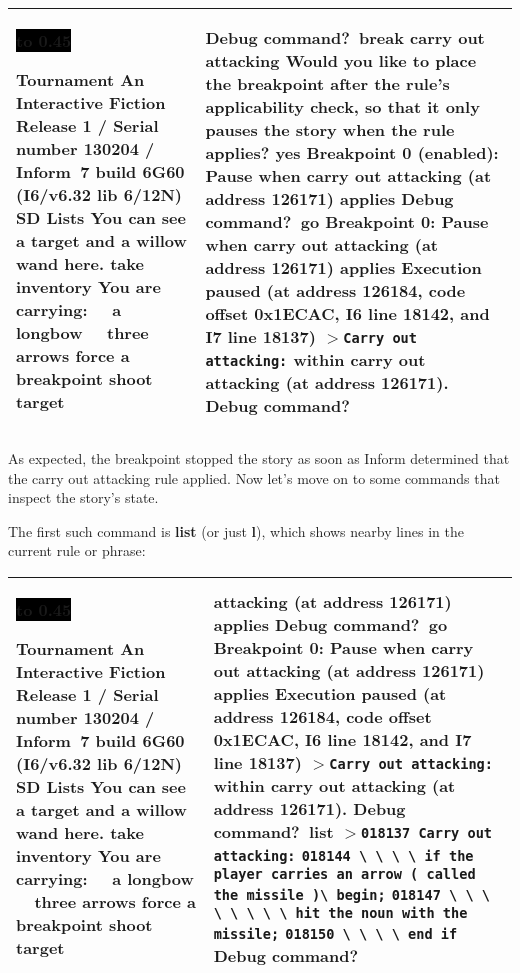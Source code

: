 \documentclass{book}
\newcommand{\n}{\hspace*{\fill}\newline}
\newcommand{\terp}[2]{\begin{center}\begin{tabular}{p{0.45\textwidth}|p{0.45\textwidth}}\midrule #1&#2\\\midrule\end{tabular}\end{center}}
\newcommand{\glkheading}[1]{\textbf{#1}}
\newcommand{\glkinput}[1]{\textbf{#1}}
\newcommand{\glkstatusline}[2]{\centerline{\colorbox{black}{\hbox to 0.45\textwidth{\textcolor{white}{#1\hfil #2}}}}}
\newcommand{\storyprompt}{\raisebox{1.5pt}{\(>\)}}
\newcommand{\cursor}{\raisebox{-1.5pt}{\RectangleThin}}
\newcommand{\markedindent}{\(>\)\qquad}
\newcommand{\unmarkedindent}{\hphantom{\(>\)}\qquad}
\begin{document}
\terp{\glkstatusline{Lists}{0/2}\n
  \glkheading{Tournament}\n
  An Interactive Fiction\n
  Release 1 / Serial number 130204 / Inform~7 build 6G60 (I6/v6.32 lib 6/12N) SD\n
  \n
  \glkheading{Lists}\n
  You can see a target and a willow wand here.\n
  \n
  \storyprompt\glkinput{take inventory}\n
  You are carrying:\n
  \null\ \ a longbow\n
  \null\ \ three arrows\n
  \n
  \storyprompt\glkinput{force a breakpoint}\n
  \storyprompt\glkinput{shoot target}}{%
  \n
  Debug command?\ \glkinput{break carry out attacking}\n
  \n
  Would you like to place the breakpoint after the rule's applicability check, so that it only pauses the story when the rule applies? \glkinput{yes}\n
  \n
  Breakpoint 0 (enabled): Pause when carry out attacking (at address 126171) applies\n
  \n
  Debug command?\ \glkinput{go}\n
  \n
  \glkheading{Breakpoint 0:} Pause when carry out attacking (at address 126171) applies\n
  \n
  Execution paused (at address 126184, code offset 0x1ECAC, I6 line 18142, and I7 line 18137)\n
  \markedindent \lstinline{Carry out attacking:}\n
  within carry out attacking (at address 126171).\n
  \n
  Debug command?\ \cursor}

As expected, the breakpoint stopped the story as soon as Inform determined that
the carry out attacking rule applied.  Now let's move on to some commands that
inspect the story's state.

The first such command is \glkinput{list} (or just \glkinput{l}), which shows
nearby lines in the current rule or phrase:

\terp{\glkstatusline{Lists}{0/2}\n
  \glkheading{Tournament}\n
  An Interactive Fiction\n
  Release 1 / Serial number 130204 / Inform~7 build 6G60 (I6/v6.32 lib 6/12N) SD\n
  \n
  \glkheading{Lists}\n
  You can see a target and a willow wand here.\n
  \n
  \storyprompt\glkinput{take inventory}\n
  You are carrying:\n
  \null\ \ a longbow\n
  \null\ \ three arrows\n
  \n
  \storyprompt\glkinput{force a breakpoint}\n
  \storyprompt\glkinput{shoot target}}{%
  attacking (at address 126171) applies\n
  \n
  Debug command?\ \glkinput{go}\n
  \n
  \glkheading{Breakpoint 0:} Pause when carry out attacking (at address 126171) applies\n
  \n
  Execution paused (at address 126184, code offset 0x1ECAC, I6 line 18142, and I7 line 18137)\n
  \markedindent \lstinline{Carry out attacking:}\n
  within carry out attacking (at address 126171).\n
  \n
  Debug command?\ \glkinput{list}\n
  \n
  \markedindent \lstinline{018137 Carry out attacking:}\n
  \unmarkedindent \lstinline{018144 \ \ \ \ if the player carries an arrow ( called the missile )}\lstinline{\ begin;}\n
  \unmarkedindent \lstinline{018147 \ \ \ \ \ \ \ \ hit the noun with the missile;}\n
  \unmarkedindent \lstinline{018150 \ \ \ \ end if}\n
  \n
  Debug command?\ \cursor}
\end{document}
